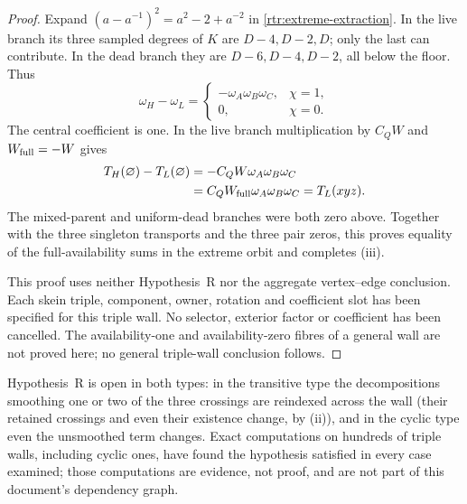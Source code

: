 \begin{proof}
Expand $(a-a^{-1})^2=a^2-2+a^{-2}$ in
\eqref{rtr:extreme-extraction}. In the live branch its three sampled
degrees of $K$ are $D-4,D-2,D$; only the last can contribute.
In the dead branch they are $D-6,D-4,D-2$, all below the floor.
Thus
\begin{equation}\label{rtr:extreme-result}
 \omega_H-\omega_L=
 \begin{cases}-\omega_A\omega_B\omega_C,&\chi=1,\\
               0,&\chi=0.
 \end{cases}
\end{equation}
The central coefficient is one. In the live branch multiplication by
$C_QW$ and $W_{\rm full}=-W$ gives
\begin{align}
 T_H(\varnothing)-T_L(\varnothing)
 &= -C_QW\omega_A\omega_B\omega_C\notag\\
 &= C_QW_{\rm full}\omega_A\omega_B\omega_C
  =T_L(xyz).\label{rtr:extreme-couple}
\end{align}
The mixed-parent and uniform-dead branches were both zero above.
Together with the three singleton transports and the three pair
zeros, this proves equality of the full-availability sums in the
extreme orbit and completes (iii).

This proof uses neither Hypothesis~R nor the aggregate
vertex--edge conclusion. Each skein triple, component, owner,
rotation and coefficient slot has been specified for this triple
wall. No selector, exterior factor or coefficient has been cancelled.
The availability-one and availability-zero fibres of a general wall
are not proved here; no general triple-wall conclusion follows.
\end{proof}


\begin{remark}\label{rem:R3-maintext}
Hypothesis~R is open in both types: in the transitive type the
decompositions smoothing one or two of the three crossings are reindexed
across the wall (their retained crossings and even their existence change,
by (ii)), and in the cyclic type even the unsmoothed term changes. Exact
computations on hundreds of triple walls, including cyclic ones, have found
the hypothesis satisfied in every case examined; those computations are
evidence, not proof, and are not part of this document's dependency graph.
\end{remark}
